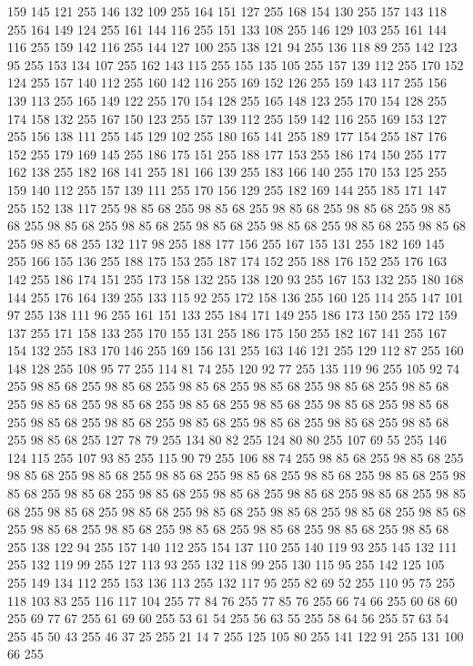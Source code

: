 159 145 121 255 146 132 109 255 164 151 127 255 168 154 130 255 157 143 118 255 164 149 124 255 161 144 116 255 151 133 108 255 146 129 103 255 161 144 116 255 159 142 116 255 144 127 100 255 138 121 94 255 136 118 89 255 142 123 95 255 153 134 107 255 162 143 115 255 155 135 105 255 157 139 112 255 170 152 124 255 157 140 112 255 160 142 116 255 169 152 126 255 159 143 117 255 156 139 113 255 165 149 122 255 170 154 128 255 165 148 123 255 170 154 128 255 174 158 132 255 167 150 123 255 157 139 112 255 159 142 116 255 169 153 127 255 156 138 111 255 145 129 102 255 180 165 141 255 189 177 154 255 187 176 152 255 179 169 145 255 186 175 151 255 188 177 153 255 186 174 150 255 177 162 138 255 182 168 141 255 181 166 139 255 183 166 140 255 170 153 125 255 159 140 112 255 157 139 111 255 170 156 129 255 182 169 144 255 185 171 147 255 152 138 117 255 98 85 68 255 98 85 68 255 98 85 68 255 98 85 68 255 98 85 68 255 98 85 68 255 98 85 68 255 98 85 68 255 98 85 68 255 98 85 68 255
98 85 68 255 98 85 68 255 132 117 98 255 188 177 156 255 167 155 131 255 182 169 145 255 166 155 136 255 188 175 153 255 187 174 152 255 188 176 152 255 176 163 142 255 186 174 151 255 173 158 132 255 138 120 93 255 167 153 132 255 180 168 144 255 176 164 139 255 133 115 92 255 172 158 136 255 160 125 114 255 147 101 97 255 138 111 96 255 161 151 133 255 184 171 149 255 186 173 150 255 172 159 137 255 171 158 133 255 170 155 131 255 186 175 150 255 182 167 141 255 167 154 132 255 183 170 146 255 169 156 131 255 163 146 121 255 129 112 87 255 160 148 128 255 108 95 77 255 114 81 74 255 120 92 77 255 135 119 96 255 105 92 74 255 98 85 68 255 98 85 68 255 98 85 68 255 98 85 68 255 98 85 68 255 98 85 68 255 98 85 68 255 98 85 68 255 98 85 68 255 98 85 68 255 98 85 68 255 98 85 68 255 98 85 68 255 98 85 68 255 98 85 68 255 98 85 68 255 98 85 68 255 98 85 68 255 98 85 68 255 127 78 79 255 134 80 82 255 124 80 80 255 107 69 55 255
146 124 115 255 107 93 85 255 115 90 79 255 106 88 74 255 98 85 68 255 98 85 68 255 98 85 68 255 98 85 68 255 98 85 68 255 98 85 68 255 98 85 68 255 98 85 68 255 98 85 68 255 98 85 68 255 98 85 68 255 98 85 68 255 98 85 68 255 98 85 68 255 98 85 68 255 98 85 68 255 98 85 68 255 98 85 68 255 98 85 68 255 98 85 68 255 98 85 68 255 98 85 68 255 98 85 68 255 98 85 68 255 98 85 68 255 98 85 68 255 98 85 68 255 138 122 94 255 157 140 112 255 154 137 110 255 140 119 93 255 145 132 111 255 132 119 99 255 127 113 93 255 132 118 99 255 130 115 95 255 142 125 105 255 149 134 112 255 153 136 113 255 132 117 95 255 82 69 52 255 110 95 75 255 118 103 83 255 116 117 104 255 77 84 76 255 77 85 76 255 66 74 66 255 60 68 60 255 69 77 67 255 61 69 60 255 53 61 54 255 56 63 55 255 58 64 56 255 57 63 54 255 45 50 43 255 46 37 25 255 21 14 7 255 125 105 80 255 141 122 91 255 131 100 66 255
